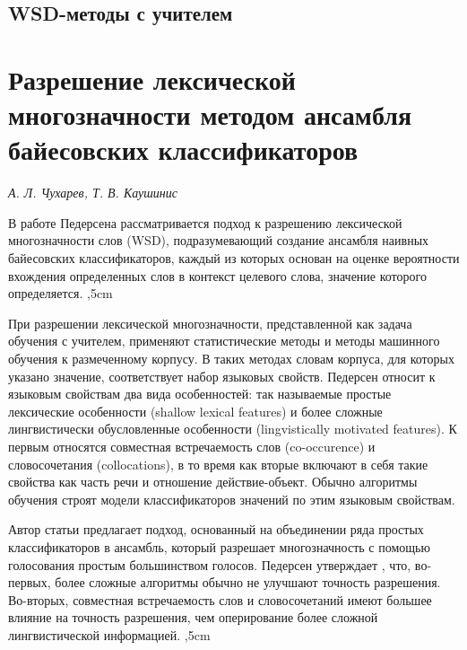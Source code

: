 \documentclass{article}
\begin{document}
\begin{articletext}
\bfullwidth
\begin{center}
\section{WSD-методы с учителем}
\end{center}
\efullwidth

\section{Разрешение лексической многозначности методом ансамбля байесовских классификаторов}

\begin{flushright}
\textit{А. Л. Чухарев, Т. В. Каушинис}
\end{flushright}

В работе Педерсена \cite{Pedersen 2000} рассматривается подход к разрешению лексической многозначности слов (WSD), подразумевающий создание ансамбля наивных байесовских классификаторов, каждый из которых основан на оценке вероятности вхождения определенных слов в контекст целевого слова, значение которого определяется.
,5cm

При разрешении лексической многозначности, представленной как задача обучения с учителем, применяют статистические методы и методы машинного обучения к размеченному корпусу. В таких методах словам корпуса, для которых указано значение, соответствует набор языковых свойств. Педерсен \cite{Pedersen 2000} относит к языковым свойствам два вида особенностей: так называемые простые лексические особенности (shallow lexical features) и более сложные лингвистически обусловленные особенности (lingvistically motivated features). К первым относятся совместная встречаемость слов (co-occurence) и словосочетания (collocations), в то время как вторые включают в себя такие свойства как часть речи и отношение действие-объект. Обычно алгоритмы обучения строят модели классификаторов значений по этим языковым свойствам.

Автор статьи \cite{Pedersen 2000} предлагает подход, основанный на объединении ряда простых классификаторов в ансамбль, который разрешает многозначность с помощью голосования простым большинством голосов. Педерсен утверждает \cite{Pedersen 2000}, что, во-первых, более сложные алгоритмы обычно не улучшают точность разрешения. Во-вторых, совместная встречаемость слов и словосочетаний имеют большее влияние на точность разрешения, чем оперирование более сложной лингвистической информацией.
,5cm



\end{articletext}
\end{document}
